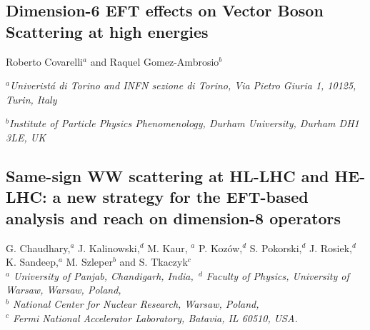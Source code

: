 \documentclass[../report.tex]{subfiles}
\providecommand{\main}{..}
\begin{document}

\subsection{Dimension-6 EFT effects on Vector Boson Scattering at high energies}

\begin{center}
\bigskip\vspace{1cm}
{Roberto Covarelli$^{a}$ and  Raquel Gomez-Ambrosio$^{b}$}
\centerline{$^a${\it Univerist\'a di Torino and INFN sezione di Torino, Via Pietro Giuria 1, 10125, Turin, Italy}}
\centerline{$^b${\it Institute of Particle Physics Phenomenology, Durham University, Durham DH1 3LE, UK}}
\end{center}



\subsection{ Same-sign WW scattering at HL-LHC and HE-LHC: a new strategy for the EFT-based analysis and reach on dimension-8 operators}\label{sect-ssWW}
\begin{center}
 {G. Chaudhary,$^a$ 
 J. Kalinowski,$^{d} $
 M. Kaur, $^a$
P. Koz{\'o}w,$^d$ S. Pokorski,$^d$
J. Rosiek,$^d$ 
K. Sandeep,$^a$
M. Szleper$^b$ 
and
S. Tkaczyk$^c$\\
}
 {\small \it
$^a$ University of Panjab, Chandigarh, India,\
 $^d$ Faculty of Physics, University of Warsaw, Warsaw,  Poland, \\
$^b$ National Center for Nuclear Research,  Warsaw, Poland, \\
$^c$  Fermi National Accelerator Laboratory, Batavia, IL 60510, USA.}
\end{center}






 

\end{document}

